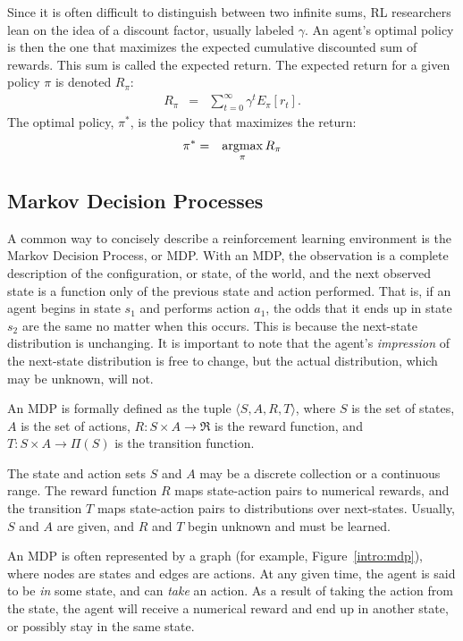Since it is often difficult to distinguish between two infinite sums, RL researchers lean on the idea of a discount factor, usually labeled $\gamma$. An agent's optimal policy is then the one that maximizes the expected cumulative discounted sum of rewards. This sum is called the expected return. The expected return for a given policy $\pi$ is denoted $R_\pi$:
\begin{eqnarray}
R_\pi &=& \sum_{t=0}^\infty \gamma^t E_\pi[r_t].
\end{eqnarray}
The optimal policy, $\pi^*$, is the policy that maximizes the return:
\begin{eqnarray}
\pi^* &=& \argmax_\pi R_\pi
\end{eqnarray}


\subsection{Markov Decision Processes}

A common way to concisely describe a reinforcement learning environment is the Markov Decision Process, or MDP. With an MDP, the observation is a complete description of the configuration, or state, of the world, and the next observed state is a function only of the previous state and action performed. That is, if an agent begins in state $s_1$ and performs action $a_1$, the odds that it ends up in state $s_2$ are the same no matter when this occurs. This is because the next-state distribution is unchanging. It is important to note that the agent's \emph{impression} of the next-state distribution is free to change, but the actual distribution, which may be unknown, will not.

An MDP is formally defined as the tuple $\langle S, A, R, T \rangle$, where $S$ is the set of states, $A$ is the set of actions, $R:S \times A \rightarrow \Re$ is the reward function, and $T:S \times A \rightarrow \Pi(S)$ is the transition function.

The state and action sets $S$ and $A$ may be a discrete collection or a continuous range. The reward function $R$ maps state-action pairs to numerical rewards, and the transition $T$ maps state-action pairs to distributions over next-states. Usually, $S$ and $A$ are given, and $R$ and $T$ begin unknown and must be learned.

An MDP is often represented by a graph (for example, Figure~\ref{intro:mdp}), where nodes are states and edges are actions. At any given time, the agent is said to be \emph{in} some state, and can \emph{take} an action. As a result of taking the action from the state, the agent will receive a numerical reward and end up in another state, or possibly stay in the same state.


